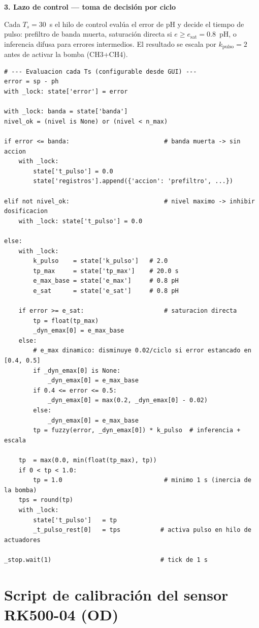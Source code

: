 \bigskip
\noindent\textbf{3. Lazo de control --- toma de decisión por ciclo}

Cada $T_s = 30$~s el hilo de control evalúa el error de pH y decide el
tiempo de pulso: prefiltro de banda muerta, saturación directa si
$e \geq e_\text{sat} = 0.8$~pH, o inferencia difusa para errores intermedios.
El resultado se escala por $k_\text{pulso} = 2$ antes de activar la bomba (CH3+CH4).

\begin{lstlisting}
# --- Evaluacion cada Ts (configurable desde GUI) ---
error = sp - ph
with _lock: state['error'] = error

with _lock: banda = state['banda']
nivel_ok = (nivel is None) or (nivel < n_max)

if error <= banda:                          # banda muerta -> sin accion
    with _lock:
        state['t_pulso'] = 0.0
        state['registros'].append({'accion': 'prefiltro', ...})

elif not nivel_ok:                          # nivel maximo -> inhibir dosificacion
    with _lock: state['t_pulso'] = 0.0

else:
    with _lock:
        k_pulso    = state['k_pulso']   # 2.0
        tp_max     = state['tp_max']    # 20.0 s
        e_max_base = state['e_max']     # 0.8 pH
        e_sat      = state['e_sat']     # 0.8 pH

    if error >= e_sat:                      # saturacion directa
        tp = float(tp_max)
        _dyn_emax[0] = e_max_base
    else:
        # e_max dinamico: disminuye 0.02/ciclo si error estancado en [0.4, 0.5]
        if _dyn_emax[0] is None:
            _dyn_emax[0] = e_max_base
        if 0.4 <= error <= 0.5:
            _dyn_emax[0] = max(0.2, _dyn_emax[0] - 0.02)
        else:
            _dyn_emax[0] = e_max_base
        tp = fuzzy(error, _dyn_emax[0]) * k_pulso  # inferencia + escala

    tp  = max(0.0, min(float(tp_max), tp))
    if 0 < tp < 1.0:
        tp = 1.0                            # minimo 1 s (inercia de la bomba)
    tps = round(tp)
    with _lock:
        state['t_pulso']   = tp
        _t_pulso_rest[0]   = tps           # activa pulso en hilo de actuadores

_stop.wait(1)                              # tick de 1 s
\end{lstlisting}

\endgroup

\section*{Script de calibración del sensor RK500-04 (OD)}

